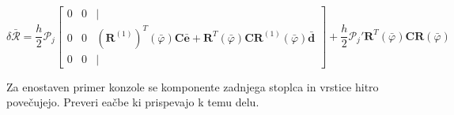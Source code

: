 \documentclass{article}
\newcommand{\dep}[1]{{\scriptstyle(#1)}}
\begin{document}
$$\delta\bar{\mathcal{R}} = \frac{h}{2}\mathcal{P}_j
\begin{bmatrix}
0 & 0 & | \\
0 & 0 & (\mathbf{R}^{(1)})^T\dep{\bar{\varphi}}\mathbf{C}\bar{\mathbf{e}} + \mathbf{R}^T\dep{\bar{\varphi}}\mathbf{CR}^{(1)}\dep{\bar{\varphi}}\bar{\mathbf{d}} \\
0 & 0 & |
\end{bmatrix} + \frac{h}{2}\mathcal{P}_j' \mathbf{R}^T\dep{\bar{\varphi}} \mathbf{CR}\dep{\bar{\varphi}}$$

Za enostaven primer konzole se komponente zadnjega stoplca in vrstice hitro povečujejo. Preveri eačbe ki prispevajo k temu delu.
\end{document}
